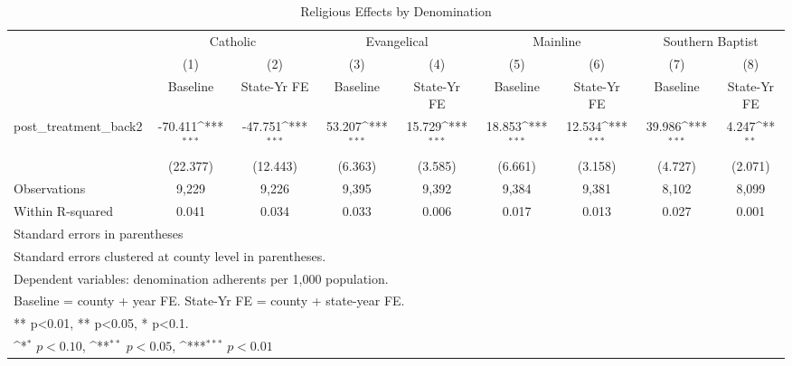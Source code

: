 \begin{table}[htbp]\centering
\def\sym#1{\ifmmode^{#1}\else\(^{#1}\)\fi}
\caption{Religious Effects by Denomination}
\begin{tabular}{l*{8}{c}}
\hline\hline
            &\multicolumn{2}{c}{Catholic}               &\multicolumn{2}{c}{Evangelical}            &\multicolumn{2}{c}{Mainline}               &\multicolumn{2}{c}{Southern Baptist}       \\\cmidrule(lr){2-3}\cmidrule(lr){4-5}\cmidrule(lr){6-7}\cmidrule(lr){8-9}
            &\multicolumn{1}{c}{(1)}&\multicolumn{1}{c}{(2)}&\multicolumn{1}{c}{(3)}&\multicolumn{1}{c}{(4)}&\multicolumn{1}{c}{(5)}&\multicolumn{1}{c}{(6)}&\multicolumn{1}{c}{(7)}&\multicolumn{1}{c}{(8)}\\
            &\multicolumn{1}{c}{Baseline}&\multicolumn{1}{c}{State-Yr FE}&\multicolumn{1}{c}{Baseline}&\multicolumn{1}{c}{State-Yr FE}&\multicolumn{1}{c}{Baseline}&\multicolumn{1}{c}{State-Yr FE}&\multicolumn{1}{c}{Baseline}&\multicolumn{1}{c}{State-Yr FE}\\
\hline
post\_treatment\_back2&     -70.411\sym{***}&     -47.751\sym{***}&      53.207\sym{***}&      15.729\sym{***}&      18.853\sym{***}&      12.534\sym{***}&      39.986\sym{***}&       4.247\sym{**} \\
            &    (22.377)         &    (12.443)         &     (6.363)         &     (3.585)         &     (6.661)         &     (3.158)         &     (4.727)         &     (2.071)         \\
\hline
Observations&       9,229         &       9,226         &       9,395         &       9,392         &       9,384         &       9,381         &       8,102         &       8,099         \\
Within R-squared&       0.041         &       0.034         &       0.033         &       0.006         &       0.017         &       0.013         &       0.027         &       0.001         \\
\hline\hline
\multicolumn{9}{l}{\footnotesize Standard errors in parentheses}\\
\multicolumn{9}{l}{\footnotesize Standard errors clustered at county level in parentheses.}\\
\multicolumn{9}{l}{\footnotesize Dependent variables: denomination adherents per 1,000 population.}\\
\multicolumn{9}{l}{\footnotesize Baseline = county + year FE. State-Yr FE = county + state-year FE.}\\
\multicolumn{9}{l}{\footnotesize *** p<0.01, ** p<0.05, * p<0.1.}\\
\multicolumn{9}{l}{\footnotesize \sym{*} \(p<0.10\), \sym{**} \(p<0.05\), \sym{***} \(p<0.01\)}\\
\end{tabular}
\end{table}

